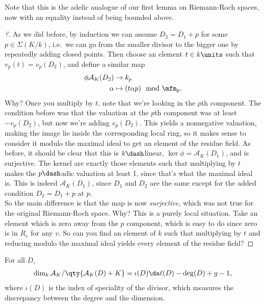 Note that this is the adelic analogue of our first lemma on Riemann-Roch
spaces, now with an equality instead of being bounded above.

\begin{proof}[?]

As we did before, by induction we can assume \(D_2 = D_1 + p\) for some
\(p\in \Sigma(K/k)\), i.e.~we can go from the smaller divisor to the
bigger one by repeatedly adding closed points. Then choose an element
\(t\in k\units\) such that \(v_p(t) = v_p(D_2)\), and define a similar
map
\begin{align*}  
\phi \mathcal{A}_K(D_2) &\to k_p \\
\alpha &\mapsto (t\alpha p) \mod \mfm_p
.\end{align*} Why? Once you multiply by \(t\), note that we're looking
in the \(p\)th component. The condition before was that the valuation at
the \(p\)th component was at least \(-v_p(D_2)\), but now we're adding
\(v_p(D_2)\). This yields a nonnegative valuation, making the image lie
inside the corresponding local ring, so it makes sense to consider it
modulo the maximal ideal to get an element of the residue field. As
before, it should be clear that this is \(k\dash\)linear,
\(\ker \phi = \mathcal{A}_K(D_1)\), and is surjective. The kernel are
exactly those elements such that multiplying by \(t\) makes the
\(p\dash\)adic valuation at least 1, since that's what the maximal ideal
is. This is indeed \(\mathcal{A}_K(D_1)\), since \(D_1\) and \(D_2\) are
the same except for the added condition \(D_2 = D_1 + p\) at \(p\).\\

So the main difference is that the map is now \emph{surjective}, which
was not true for the original Riemann-Roch space. Why? This is a purely
local situation. Take an element which is zero away from the \(p\)
component, which is easy to do since zero is in \(R_v\) for any \(v\).
So can you find an element of \(k\) such that multiplying by \(t\) and
reducing modulo the maximal ideal yields every element of the residue
field?

\end{proof}

\begin{theorem}[2.13]

For all \(D\),
\begin{align*}  
\dim_k \mathcal{A}_K / \qty{\mathcal{A}_K(D) + K } = \iota(D) \da \ell(D) - \deg(D) + g - 1
,\end{align*} where \(\iota(D)\) is the index of speciality of the
divisor, which measures the discrepancy between the degree and the
dimension.

\end{theorem}

